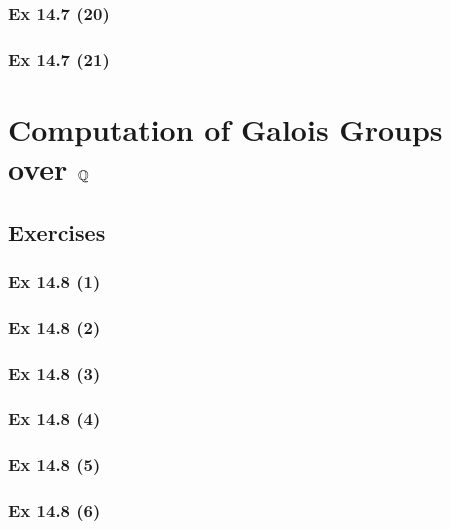 \subsubsection{Ex 14.7 (20)}\label{sec:Ex_14.7.20}

\subsubsection{Ex 14.7 (21)}\label{sec:Ex_14.7.21}

\newpage		%

\section{Computation of Galois Groups over $\mathbb{Q}$}\label{sec:14.8}	
\subsection*{Exercises}\label{sec:14.8_Exercises}

\subsubsection{Ex 14.8 (1)}\label{sec:Ex_14.8.1}

\subsubsection{Ex 14.8 (2)}\label{sec:Ex_14.8.2}

\subsubsection{Ex 14.8 (3)}\label{sec:Ex_14.8.3}

\subsubsection{Ex 14.8 (4)}\label{sec:Ex_14.8.4}

\subsubsection{Ex 14.8 (5)}\label{sec:Ex_14.8.5}

\subsubsection{Ex 14.8 (6)}\label{sec:Ex_14.8.6}

